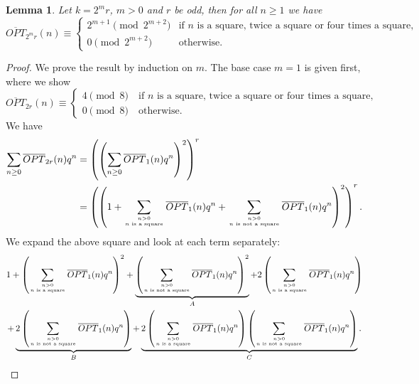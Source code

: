 \documentclass[12pt,reqno]{amsart}
\numberwithin{equation}{section}
\newcommand\mycom[2]{\genfrac{}{}{0pt}{}{#1}{#2}}
\newcommand{\opt}{\overline{OPT}}
\newtheorem{lemma}{Lemma}[section]
\begin{document}
\begin{lemma}\label{lem:new}
    Let $k=2^mr$, $m> 0$ and $r$ be odd, then for all $n\geq 1$ we have
\[
        \opt_{2^mr}(n)\equiv \begin{cases} 2^{m+1}\pmod {2^{m+2}} &\text{if $n$ is a square, twice a square or four times a square,}\\0 \pmod {2^{m+2}} & \text{otherwise}.
    \end{cases}
    \]
\end{lemma}
\begin{proof}
We prove the result by induction on $m$. The base case $m=1$ is given first, where we show
\[
        \opt_{2r}(n)\equiv \begin{cases} 4\pmod 8\quad \text{if $n$ is a square, twice a square or four times a square,}\\0 \pmod8 \quad \text{otherwise}.
    \end{cases}
    \]
    We have
    \begin{align*}
        \sum_{n\geq 0}\opt_{2r}(n)q^n&=\left(\left(\sum_{n\geq 0}\opt_1(n)q^n\right)^2\right)^r\\
        &=\left(\left(1+\sum_{\mycom{n>0}{\text{$n$ is a square}}}\opt_1(n)q^n+\sum_{\mycom{n>0}{\text{$n$ is not a square}}}\opt_1(n)q^n\right)^2\right)^r.
    \end{align*}
We expand the above square and look at each term separately:
\begin{multline*}
    1+\left(\sum_{\mycom{n>0}{\text{$n$ is a square}}}\opt_1(n)q^n\right)^2+\underbrace{\left(\sum_{\mycom{n>0}{\text{$n$ is not a square}}}\opt_1(n)q^n\right)^2}_{A}+2\left(\sum_{\mycom{n>0}{\text{$n$ is a square}}}\opt_1(n)q^n\right)\\
    +\underbrace{2\left(\sum_{\mycom{n>0}{\text{$n$ is not a square}}}\opt_1(n)q^n\right)}_{B}+\underbrace{2\left(\sum_{\mycom{n>0}{\text{$n$ is a square}}}\opt_1(n)q^n\right)\left(\sum_{\mycom{n>0}{\text{$n$ is not a square}}}\opt_1(n)q^n\right)}_{C}.
\end{multline*}


\end{proof}
\end{document}
